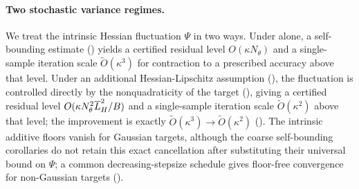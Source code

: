 \paragraph{Two stochastic variance regimes.}
We treat the intrinsic Hessian fluctuation $\Psi$ in two ways. Under
 alone, a self-bounding estimate
() yields a certified residual level $O(\kappa N_\theta)$ and a
single-sample iteration scale $\widetilde O(\kappa^3)$ for contraction to a prescribed accuracy above
that level. Under an additional Hessian-Lipschitz assumption
(), the fluctuation is controlled directly by the nonquadraticity of
the target (), giving a certified residual level
$O(\kappa N_\theta^2\overline{L}_H^2/B)$ and a single-sample iteration scale
$\widetilde O(\kappa^2)$ above that level; the improvement is exactly
$\widetilde O(\kappa^3)\to\widetilde O(\kappa^2)$ (). The intrinsic additive
floors vanish for Gaussian targets, although the coarse self-bounding corollaries do not retain this
exact cancellation after substituting their universal bound on $\Psi$; a common decreasing-stepsize
schedule gives floor-free convergence for non-Gaussian targets ().

